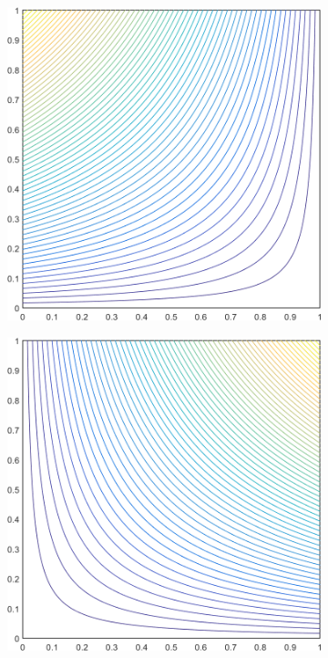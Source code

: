 \begin{figure}
\centering
	\begin{subfigure}[b]{0.39\textwidth}
		\centering
		\includegraphics[width=\textwidth]{figures/sec_BF/square_MAXENT1_contour_b4.png}
		\caption{}
	\end{subfigure}
	\hspace{1.5cm}
	\begin{subfigure}[b]{0.39\textwidth}
		\centering
		\includegraphics[width=\textwidth]{figures/sec_BF/square_MAXENT1_contour_b3.png}

\end{subfigure}
\end{figure}
